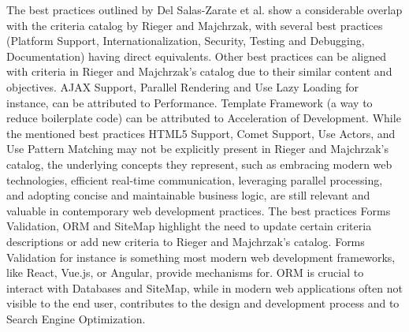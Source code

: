 The best practices outlined by Del Salas-Zarate et al. show a considerable overlap with the criteria catalog by Rieger and Majchrzak, with several best practices (Platform Support, Internationalization, Security, Testing and Debugging, Documentation) having direct equivalents. Other best practices can be aligned with criteria in Rieger and Majchrzak's catalog due to their similar content and objectives. AJAX Support, Parallel Rendering and Use Lazy Loading for instance, can be attributed to Performance. Template Framework (a way to reduce boilerplate code) can be attributed to Acceleration of Development.
While the mentioned best practices HTML5 Support, Comet Support, Use Actors, and Use Pattern Matching may not be explicitly present in Rieger and Majchrzak's catalog, the underlying concepts they represent, such as embracing modern web technologies, efficient real-time communication, leveraging parallel processing, and adopting concise and maintainable business logic, are still relevant and valuable in contemporary web development practices.
The best practices Forms Validation, ORM and SiteMap highlight the need to update certain criteria descriptions or add new criteria to Rieger and Majchrzak's catalog. Forms Validation for instance is something most modern web development frameworks, like React, Vue.js, or Angular, provide mechanisms for. ORM is crucial to interact with Databases and SiteMap, while in modern web applications often not visible to the end user, contributes to the design and development process and to Search Engine Optimization.

